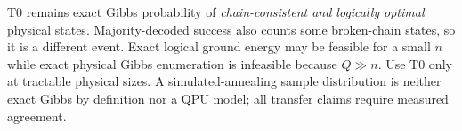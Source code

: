 T0 remains exact Gibbs probability of \emph{chain-consistent and logically optimal} physical states. Majority-decoded success also counts some broken-chain states, so it is a different event. Exact logical ground energy may be feasible for a small $n$ while exact physical Gibbs enumeration is infeasible because $Q\gg n$. Use T0 only at tractable physical sizes. A simulated-annealing sample distribution is neither exact Gibbs by definition nor a QPU model; all transfer claims require measured agreement.
